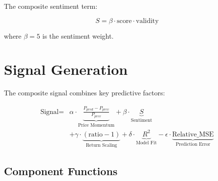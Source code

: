 \documentclass{article}
\begin{document}
	The composite sentiment term:
	
	\begin{equation}
		S = \beta \cdot \text{score} \cdot \text{validity}
	\end{equation}
	
	where $\beta=5$ is the sentiment weight.
	
	\section{Signal Generation}
	
	The composite signal combines key predictive factors:
	
	\begin{equation}
		\begin{aligned}
			\text{Signal} = &\alpha \cdot \underbrace{\frac{P_{pred} - P_{prev}}{P_{prev}}}_{\text{Price Momentum}} 
			+ \beta \cdot \underbrace{S}_{\text{Sentiment}} \\
			&+ \gamma \cdot \underbrace{(\text{ratio} - 1)}_{\text{Return Scaling}} 
			+ \delta \cdot \underbrace{R^2}_{\text{Model Fit}} 
			- \epsilon \cdot \underbrace{\text{Relative\_MSE}}_{\text{Prediction Error}}
		\end{aligned}
	\end{equation}
	
	\subsection{Component Functions}
	
\end{document}
